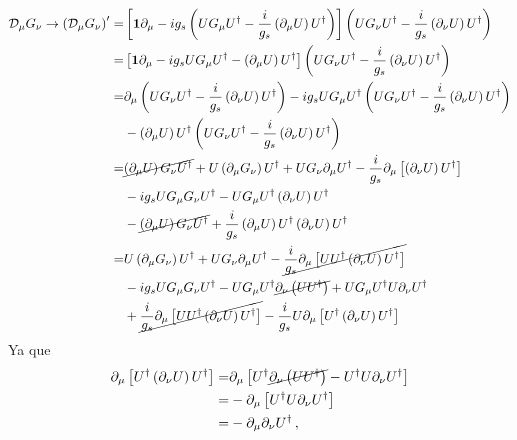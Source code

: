 \begin{align}
\label{eq:tdcg}
 \mathcal{D}_{\mu} G_{\nu}\to   \left(   \mathcal{D}_{\mu} G_{\nu} \right)' =&
\left[\boldsymbol{1}\partial_{\mu}-i g_s\left(U G_\mu U^{\dagger}-\frac{i}{g_s}\left(\partial_\mu U\right)U^\dagger  \right)   \right] \left(U G_\nu U^{\dagger}-\frac{i}{g_s}\left(\partial_\nu U\right)U^\dagger  \right) \nonumber\\
=&
\left[\boldsymbol{1}\partial_{\mu}-i g_sU G_\mu U^{\dagger}-\left(\partial_\mu U\right)U^\dagger   \right] \left(U G_\nu U^{\dagger}-\frac{i}{g_s}\left(\partial_\nu U\right)U^\dagger  \right) \nonumber\\
=&
\partial_{\mu} \left(U G_\nu U^{\dagger}-\frac{i}{g_s}\left(\partial_\nu U\right)U^\dagger  \right)
-i g_sU G_\mu U^{\dagger}\left(U G_\nu U^{\dagger}-\frac{i}{g_s}\left(\partial_\nu U\right)U^\dagger  \right)
\nonumber\\
&-\left(\partial_\mu U\right)U^\dagger\left(U G_\nu U^{\dagger}-\frac{i}{g_s}\left(\partial_\nu U\right)U^\dagger  \right) \nonumber\\
  =& \cancel{\left(\partial_{\mu} U \right) G_\nu U^{\dagger}} + U
  \left( \partial_{\mu}G_\nu \right) U^{\dagger} + U
  G_{\nu} \partial_{\mu} U^{\dagger} -\frac{i}{g_s}\partial_{\mu}
  \left[ \left( \partial_{\nu}U \right)U^{\dagger} \right]
  \nonumber\\
  &-i g_s U G_{\mu}G_{\nu}U^{\dagger}- UG_{\mu} U^{\dagger} \left( \partial_{\nu} U\right)U^{\dagger} \nonumber\\
  &-\cancel{\left( \partial_{\mu}U \right)G_{\nu} U^{\dagger}}
  +\frac{i}{g_s} \left( \partial_{\mu}U \right) U^{\dagger} \left( \partial_{\nu}U \right) U^{\dagger} \nonumber\\
  =& U \left( \partial_{\mu}G_\nu \right) U^{\dagger} + U
  G_{\nu} \partial_{\mu} U^{\dagger}
  -\cancel{\frac{i}{g_s}\partial_{\mu} \left[ U
      U^{\dagger}\left( \partial_{\nu}U \right)U^{\dagger} \right]}
  \nonumber\\
  &-i g_s U G_{\mu}G_{\nu}U^{\dagger}- UG_{\mu}
  U^{\dagger}\cancel{ \partial_{\nu}\left( UU^{\dagger} \right)}+
  UG_{\mu} U^{\dagger} U\partial_{\nu}U^{\dagger}
  \nonumber\\
  &+\cancel{\frac{i}{g_s} \partial_{\mu} \left[ U U^{\dagger}
      \left( \partial_{\nu}U \right) U^{\dagger}\right]}-
  \frac{i}{g_s} U \partial_{\mu} \left[ U^{\dagger}
    \left( \partial_{\nu}U \right) U^{\dagger}\right]
\end{align}
Ya que
\begin{align}
 \partial_{\mu} \left[ U^{\dagger}
    \left( \partial_{\nu}U \right) U^{\dagger}\right]=&
 \partial_{\mu} \left[ U^{\dagger}
    \cancel{\partial_{\nu}\left( U U^{\dagger}\right)} -U^{\dagger}U \partial_{\nu} U^{\dagger}\right] \nonumber\\
=&- \partial_{\mu} \left[ U^{\dagger} U \partial_{\nu} U^{\dagger}\right] \nonumber\\
=&- \partial_{\mu}  \partial_{\nu} U^{\dagger} \,,
\end{align}

